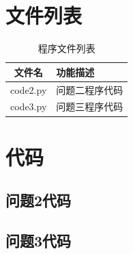 \documentclass[withoutpreface,bwprint]{cumcmthesis} %
\begin{document}
\begin{appendices}
\begin{table}[H]
\begin{threeparttable}
\begin{tabularx}{\textwidth}{c |c c | c c | c c}
            \bottomrule[1.5pt]
        
        \end{tabularx}
    \end{threeparttable}
\end{table}



\section{文件列表}
\begin{table}[H]
    \caption{程序文件列表}
    \centering
    \begin{tabularx}{\textwidth}{c l}
        \bottomrule[1.5pt]
        文件名 & 功能描述 \\
        \midrule[1pt]
        code2.py & 问题二程序代码 \\
        code3.py & 问题三程序代码 \\
        \bottomrule[1.5pt]
    \end{tabularx}
    \label{tab:文件列表}
\end{table}

\section{代码}

\subsection{问题2代码}


\subsection{问题3代码}


\end{appendices}
\end{document}
